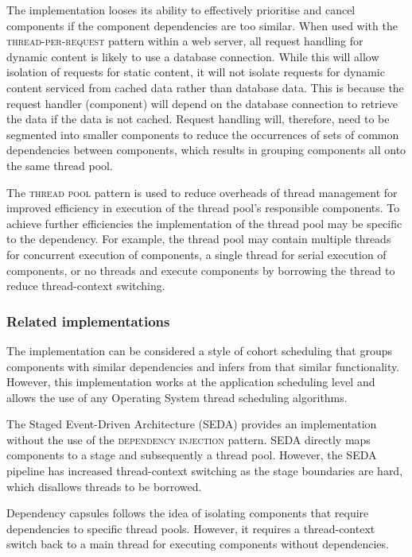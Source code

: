 \documentclass[prodmode]{style/acmlarge}
\begin{document}
The implementation looses its ability to effectively prioritise and cancel
components if the component dependencies are too similar.
When used with the \textsc{thread-per-request} pattern within a web server, all
request handling for dynamic content is likely to use a database connection.
While this will allow isolation of requests for static content, it will not
isolate requests for dynamic content serviced from cached data rather than
database data.  This is because the request handler (component) will depend on
the database connection to retrieve the data if the data is not cached.  Request
handling will, therefore, need to be segmented into smaller components to reduce
the occurrences of sets of common dependencies between components, which results
in grouping components all onto the same thread pool.

The \textsc{thread pool} pattern \cite{thread-per-request} is used to reduce
overheads of thread management for improved efficiency in execution of the
thread pool's responsible components.  To achieve further efficiencies the
implementation of the thread pool may be specific to the dependency.  For
example, the thread pool may contain multiple threads for concurrent execution
of components, a single thread for serial execution of components, or no
threads and execute components by borrowing the thread to reduce thread-context
switching.


\subsubsection*{Related implementations}

The implementation can be considered a style of cohort scheduling \cite{cohort}
that groups components with similar dependencies and infers from that similar
functionality.  However, this implementation works at the application scheduling
level and allows the use of any Operating System thread scheduling algorithms.

The Staged Event-Driven Architecture (SEDA) \cite{seda} provides an
implementation without the use of the \textsc{dependency injection} pattern. 
SEDA directly maps components to a stage and subsequently a thread pool. 
However, the SEDA pipeline has increased thread-context switching as the stage
boundaries are hard, which disallows threads to be borrowed.

Dependency capsules \cite{dependency-capsules} follows the idea of isolating
components that require dependencies to specific thread pools.  However, it
requires a thread-context switch back to a main thread for executing components
without dependencies.
\end{document}
